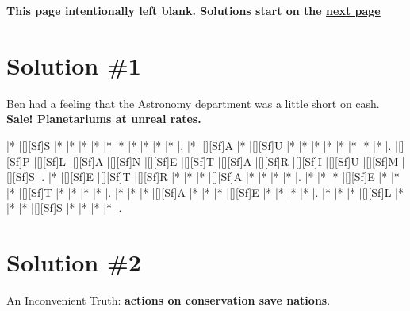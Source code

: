 \documentclass[letterpaper]{article}
\begin{document}
\newpage
\begin{center}
\textbf{This page intentionally left blank. Solutions start on the \hyperlink{page.7}{next page}}
\end{center}

\newpage

\section*{Solution \#1}
Ben had a feeling that the Astronomy department was a little short on cash.
\newline\textbf{Sale! Planetariums at unreal rates.}

\vspace*{0.5cm}
\begin{Puzzle}{12}{8}
|*        |[][Sf]S  |*        |*        |*        |*        |*        |*        |*        |*        |*        |*        |.
|*        |[][Sf]A  |*        |[][Sf]U  |*        |*        |*        |*        |*        |*        |*        |*        |.
|[][Sf]P  |[][Sf]L  |[][Sf]A  |[][Sf]N  |[][Sf]E  |[][Sf]T  |[][Sf]A  |[][Sf]R  |[][Sf]I  |[][Sf]U  |[][Sf]M  |[][Sf]S  |.
|*        |[][Sf]E  |[][Sf]T  |[][Sf]R  |*        |*        |*        |[][Sf]A  |*        |*        |*        |*        |.
|*        |*        |*        |[][Sf]E  |*        |*        |*        |[][Sf]T  |*        |*        |*        |*        |.
|*        |*        |*        |[][Sf]A  |*        |*        |*        |[][Sf]E  |*        |*        |*        |*        |.
|*        |*        |*        |[][Sf]L  |*        |*        |*        |[][Sf]S  |*        |*        |*        |*        |.
\end{Puzzle}

\newpage

\section*{Solution \#2}

An Inconvenient Truth: \textbf{actions on conservation save nations}.
\end{document}

